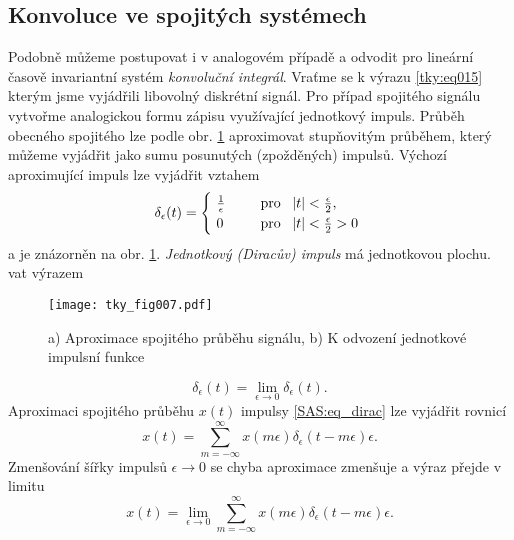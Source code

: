     \subsection{Konvoluce ve spojitých systémech}\label{tky:IchIIsecIssecIII}
      Podobně můžeme postupovat i v analogovém případě a odvodit pro lineární časově invariantní
      systém \emph{konvoluční integrál}. Vraťme se k výrazu \ref{tky:eq015} kterým jsme vyjádřili
      libovolný diskrétní signál. Pro případ spojitého signálu vytvořme analogickou formu zápisu
      využívající jednotkový impuls. Průběh obecného spojitého lze podle obr. \ref{tky:fig007}
      aproximovat stupňovitým průběhem, který můžeme vyjádřit jako sumu posunutých (zpožděných)
      impulsů. Výchozí aproximující impuls lze vyjádřit vztahem
      \begin{equation}\label{SAS:eq_dirac}
          \delta_\epsilon(t)  =
            \begin{cases}
               \frac{1}{\epsilon} & \text{pro } \abs{t} < \frac{\epsilon}{2},      \\
               0                  & \text{pro } \abs{t} < \frac{\epsilon}{2} > 0
            \end{cases}
      \end{equation}
      a je znázorněn na obr. \ref{tky:fig007}. \emph{Jednotkový (Diracův) impuls} 
      má jednotkovou plochu. vat výrazem
      \begin{figure}[ht!]
        \centering
        \texttt{[image: tky\_fig007.pdf]}
        \caption{a) Aproximace spojitého průběhu signálu, b) K odvození jednotkové impulsní funkce}
        \label{tky:fig007}
      \end{figure}
      \begin{equation}\label{SAS:eq_dirac2}
        \delta_\epsilon(t) = \lim_{\epsilon\rightarrow0} \delta_\epsilon(t).
      \end{equation}
      Aproximaci spojitého průběhu $x(t)$ impulsy \ref{SAS:eq_dirac} lze vyjádřit rovnicí
      \begin{equation}\label{SAS:eq_spojit_aprox}
        x(t) = \sum_{m = -\infty}^\infty x(m\epsilon)\delta_\epsilon(t - m\epsilon)\epsilon .
      \end{equation}
      Zmenšování šířky impulsů $\epsilon \rightarrow 0$ se chyba aproximace zmenšuje a výraz přejde
      v limitu
      \begin{equation}\label{SAS:eq_spojit_aprox2}
        x(t) = \lim_{\epsilon\rightarrow0}
               \sum_{m = -\infty}^\infty x(m\epsilon)\delta_\epsilon(t - m\epsilon)\epsilon .        
      \end{equation}
